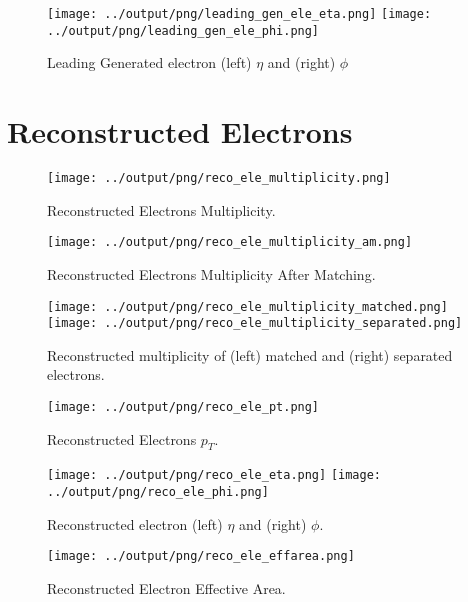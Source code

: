 \documentclass[11pt]{book}
\begin{document}
\begin{figure}[htb]
\centering
\texttt{[image: ../output/png/leading\_gen\_ele\_eta.png]}
\texttt{[image: ../output/png/leading\_gen\_ele\_phi.png]}
\caption{Leading Generated electron (left) $\eta$ and (right) $\phi$}
\label{fig:leading_gen_ele_eta_phi}
\end{figure}
\clearpage

\section{Reconstructed Electrons}

\begin{figure}[htb]
\centering
\texttt{[image: ../output/png/reco\_ele\_multiplicity.png]}
\caption{Reconstructed Electrons Multiplicity.}
\label{fig:reco_ele_multiplicity}
\end{figure}

\begin{figure}[htb]
\centering
\texttt{[image: ../output/png/reco\_ele\_multiplicity\_am.png]}
\caption{Reconstructed Electrons Multiplicity After Matching.}
\label{fig:reco_ele_multiplicity_am}
\end{figure}

\begin{figure}[htb]
\centering
\texttt{[image: ../output/png/reco\_ele\_multiplicity\_matched.png]}
\texttt{[image: ../output/png/reco\_ele\_multiplicity\_separated.png]}
\caption{Reconstructed multiplicity of (left) matched and (right) separated electrons.}
\label{fig:reco_ele_mat_sep}
\end{figure}

\begin{figure}[htb]
\centering
\texttt{[image: ../output/png/reco\_ele\_pt.png]}
\caption{Reconstructed Electrons $p_{T}$.}
\label{fig:reco_ele_pt}
\end{figure}

\begin{figure}[htb]
\centering
\texttt{[image: ../output/png/reco\_ele\_eta.png]}
\texttt{[image: ../output/png/reco\_ele\_phi.png]}
\caption{Reconstructed electron (left) $\eta$ and (right) $\phi$.}
\label{fig:reco_ele_eta_phi}
\end{figure}

\begin{figure}[htb]
\centering
\texttt{[image: ../output/png/reco\_ele\_effarea.png]}
\caption{Reconstructed Electron Effective Area.}
\label{fig:reco_ele_effarea}
\end{figure}
\end{document}

